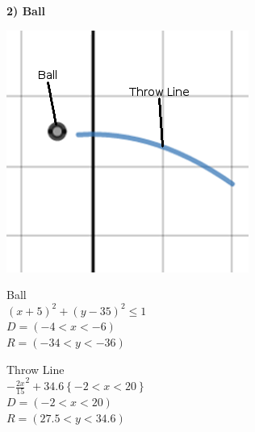 \documentclass[12pt]{article}
\begin{document}
\begin{center}
\begin{large}
\textbf{2) Ball}\\
\end{large}
\includegraphics{ball}

{
Ball\\
$\left(x+5\right)^2+\left(y-35\right)^2\le1$\\
$D = (-4 < x < -6)$\\
$R = (-34 < y < -36)$\\
\bigbreak

Throw Line\\
$-\frac{2x}{15}^2+34.6\left\{-2<x<20\right\}$\\
$D = (-2 < x < 20)$\\
$R = (27.5 < y < 34.6)$\\
\bigbreak
}
\end{center}
\clearpage
\end{document}
